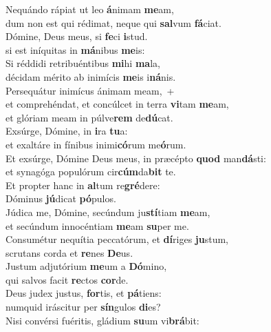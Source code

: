 \evenverse Nequándo rápiat ut leo \textbf{á}nimam \textbf{me}am,~\*\\
\evenverse dum non est qui rédimat, neque qui \textbf{sal}vum \textbf{fá}ciat.\\
\oddverse Dómine, Deus meus, si \textbf{fe}ci \textbf{i}stud.~\*\\
\oddverse si est iníquitas in \textbf{má}nibus \textbf{me}is:\\
\evenverse Si réddidi retribuéntibus \textbf{mi}hi \textbf{ma}la,~\*\\
\evenverse décidam mérito ab inimícis \textbf{me}is i\textbf{ná}nis.\\
\oddverse Persequátur inimícus ánimam meam,~+\\
\oddverse  et comprehéndat, et concúlcet in terra \textbf{vi}tam \textbf{me}am,~\*\\
\oddverse et glóriam meam in púlve\textbf{rem} de\textbf{dú}cat.\\
\evenverse Exsúrge, Dómine, in \textbf{i}ra \textbf{tu}a:~\*\\
\evenverse et exaltáre in fínibus inimi\textbf{có}rum me\textbf{ó}rum.\\
\oddverse Et exsúrge, Dómine Deus meus, in præcépto \textbf{quod} man\textbf{dá}sti:~\*\\
\oddverse et synagóga populórum cir\textbf{cúm}da\textbf{bit} te.\\
\evenverse Et propter hanc in \textbf{al}tum re\textbf{gré}dere:~\*\\
\evenverse Dóminus \textbf{jú}dicat \textbf{pó}pulos.\\
\oddverse Júdica me, Dómine, secúndum ju\textbf{stí}tiam \textbf{me}am,~\*\\
\oddverse et secúndum innocéntiam \textbf{me}am \textbf{su}per me.\\
\evenverse Consumétur nequítia peccatórum, et \textbf{dí}riges \textbf{ju}stum,~\*\\
\evenverse scrutans corda et \textbf{re}nes \textbf{De}us.\\
\oddverse Justum adjutórium \textbf{me}um a \textbf{Dó}mino,~\*\\
\oddverse qui salvos facit \textbf{re}ctos \textbf{cor}de.\\
\evenverse Deus judex justus, \textbf{for}tis, et \textbf{pá}tiens:~\*\\
\evenverse numquid iráscitur per \textbf{sín}gulos \textbf{di}es?\\
\oddverse Nisi convérsi fuéritis, gládium \textbf{su}um vi\textbf{brá}bit:~\*\\
